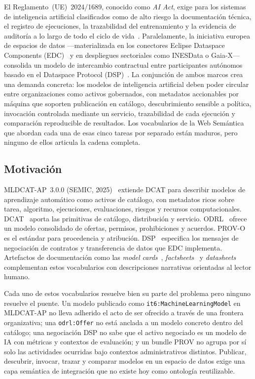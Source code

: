 \documentclass[11pt,a4paper]{article}
\newcommand{\code}[1]{\texttt{#1}}
\begin{document}
El Reglamento~(UE)~2024/1689, conocido como \emph{AI Act}, exige para los sistemas de inteligencia artificial clasificados como de alto riesgo la documentación técnica, el registro de ejecuciones, la trazabilidad del entrenamiento y la evidencia de auditoría a lo largo de todo el ciclo de vida~\cite{aiact}. Paralelamente, la iniciativa europea de espacios de datos ---materializada en los conectores Eclipse Dataspace Components (EDC)~\cite{edc} y en despliegues sectoriales como INESData o Gaia-X--- consolida un modelo de intercambio contractual entre participantes autónomos basado en el Dataspace Protocol (DSP)~\cite{dsp}. La conjunción de ambos marcos crea una demanda concreta: los modelos de inteligencia artificial deben poder circular entre organizaciones como activos gobernados, con metadatos accionables por máquina que soporten publicación en catálogo, descubrimiento sensible a política, invocación controlada mediante un servicio, trazabilidad de cada ejecución y comparación reproducible de resultados. Los vocabularios de la Web Semántica que abordan cada una de esas cinco tareas por separado están maduros, pero ninguno de ellos articula la cadena completa.

\subsection{Motivación}

MLDCAT-AP~3.0.0 (SEMIC, 2025)~\cite{mldcatap} extiende DCAT para describir modelos de aprendizaje automático como activos de catálogo, con metadatos ricos sobre tarea, algoritmo, ejecuciones, evaluaciones, riesgos y recursos computacionales. DCAT~\cite{dcat2} aporta las primitivas de catálogo, distribución y servicio. ODRL~\cite{odrl22} ofrece un modelo consolidado de ofertas, permisos, prohibiciones y acuerdos. PROV-O~\cite{provo} es el estándar para procedencia y atribución. DSP~\cite{dsp} especifica los mensajes de negociación de contratos y transferencia de datos que EDC implementa. Artefactos de documentación como las \emph{model cards}~\cite{mitchell19}, \emph{factsheets}~\cite{arnold19} y \emph{datasheets}~\cite{gebru21} complementan estos vocabularios con descripciones narrativas orientadas al lector humano.

Cada uno de estos vocabularios resuelve bien su parte del problema pero ninguno resuelve el puente. Un modelo publicado como \code{it6:MachineLearningModel} en MLDCAT-AP no lleva adherido el acto de ser ofrecido a través de una frontera organizativa; una \code{odrl:Offer} no está anclada a un modelo concreto dentro del catálogo; una negociación DSP no sabe que el activo negociado es un modelo de IA con métricas y contextos de evaluación; y un bundle PROV no agrupa por sí solo las actividades ocurridas bajo contextos administrativos distintos. Publicar, descubrir, invocar, trazar y comparar modelos en un espacio de datos exige una capa semántica de integración que no existe hoy como ontología reutilizable.
\end{document}
